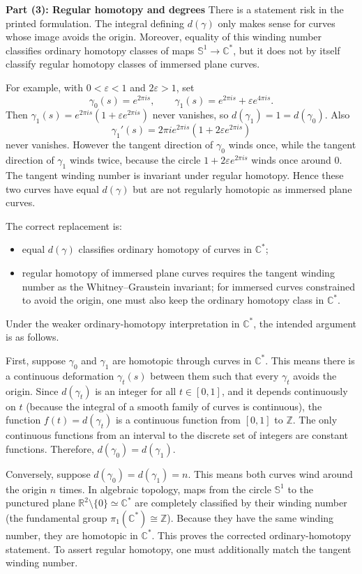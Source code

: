 \begin{solution}
\textbf{Part (3): Regular homotopy and degrees}
There is a statement risk in the printed formulation.  The integral defining $d(\gamma)$ only makes sense for curves whose image avoids the origin.  Moreover, equality of this winding number classifies ordinary homotopy classes of maps $\mathbb{S}^1\to\mathbb{C}^*$, but it does not by itself classify regular homotopy classes of immersed plane curves.

For example, with $0<\varepsilon<1$ and $2\varepsilon>1$, set
\[
\gamma_0(s)=e^{2\pi is},
\qquad
\gamma_1(s)=e^{2\pi is}+\varepsilon e^{4\pi is}.
\]
Then $\gamma_1(s)=e^{2\pi is}(1+\varepsilon e^{2\pi is})$ never vanishes, so $d(\gamma_1)=1=d(\gamma_0)$.  Also
\[
\gamma_1'(s)=2\pi i e^{2\pi is}(1+2\varepsilon e^{2\pi is})
\]
never vanishes.  However the tangent direction of $\gamma_0$ winds once, while the tangent direction of $\gamma_1$ winds twice, because the circle $1+2\varepsilon e^{2\pi is}$ winds once around $0$.  The tangent winding number is invariant under regular homotopy.  Hence these two curves have equal $d(\gamma)$ but are not regularly homotopic as immersed plane curves.

The correct replacement is:
\begin{itemize}
\item equal $d(\gamma)$ classifies ordinary homotopy of curves in $\mathbb{C}^*$;
\item regular homotopy of immersed plane curves requires the tangent winding number as the Whitney--Graustein invariant; for immersed curves constrained to avoid the origin, one must also keep the ordinary homotopy class in $\mathbb{C}^*$.
\end{itemize}

Under the weaker ordinary-homotopy interpretation in $\mathbb{C}^*$, the intended argument is as follows.

First, suppose $\gamma_0$ and $\gamma_1$ are homotopic through curves in $\mathbb{C}^*$.  This means there is a continuous deformation $\gamma_t(s)$ between them such that every $\gamma_t$ avoids the origin. Since $d(\gamma_t)$ is an integer for all $t \in [0, 1]$, and it depends continuously on $t$ (because the integral of a smooth family of curves is continuous), the function $f(t) = d(\gamma_t)$ is a continuous function from $[0, 1]$ to $\mathbb{Z}$. The only continuous functions from an interval to the discrete set of integers are constant functions. Therefore, $d(\gamma_0) = d(\gamma_1)$.

Conversely, suppose $d(\gamma_0) = d(\gamma_1) = n$. This means both curves wind around the origin $n$ times.
In algebraic topology, maps from the circle $\mathbb{S}^1$ to the punctured plane $\mathbb{R}^2 \setminus \{0\} \simeq \mathbb{C}^*$ are completely classified by their winding number (the fundamental group $\pi_1(\mathbb{C}^*) \cong \mathbb{Z}$). Because they have the same winding number, they are homotopic in $\mathbb{C}^*$.  This proves the corrected ordinary-homotopy statement.  To assert regular homotopy, one must additionally match the tangent winding number.
\end{solution}

